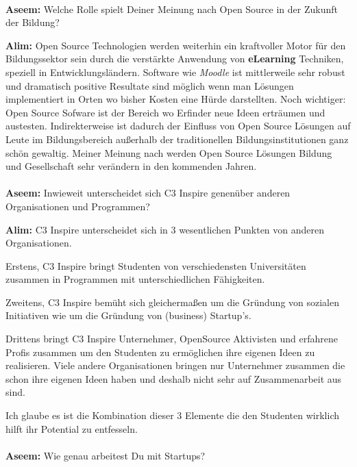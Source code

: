 \paragraph{}
\textbf{Aseem:} Welche Rolle spielt Deiner Meinung nach Open Source in der 
Zukunft der Bildung?

\textbf{Alim:} Open Source Technologien werden weiterhin ein kraftvoller Motor 
für den Bildungssektor sein durch die verstärkte Anwendung von 
\textbf{eLearning} Techniken, speziell in Entwicklungsländern. Software wie 
\textit{Moodle} ist mittlerweile sehr robust und dramatisch positive Resultate 
sind möglich wenn man Lösungen implementiert in Orten wo bisher 
Kosten eine Hürde darstellten. Noch wichtiger: Open Source Sofware ist 
der Bereich wo Erfinder neue Ideen erträumen und austesten. 
Indirekterweise ist dadurch der Einfluss von Open Source Lösungen auf 
Leute im Bildungsbereich außerhalb der traditionellen 
Bildungsinstitutionen ganz schön gewaltig. Meiner Meinung nach werden 
Open Source Lösungen Bildung und Gesellschaft sehr verändern in den 
kommenden Jahren.

\paragraph{}
\textbf{Aseem:} Inwieweit unterscheidet sich C3 Inspire genenüber anderen 
Organisationen und Programmen?

\textbf{Alim:} C3 Inspire unterscheidet sich in 3 wesentlichen Punkten von 
anderen Organisationen. 

Erstens, C3 Inspire bringt Studenten von 
verschiedensten Universitäten zusammen in Programmen mit 
unterschiedlichen Fähigkeiten. 

Zweitens, C3 Inspire bemüht sich gleichermaßen um die Gründung von 
sozialen Initiativen wie um die Gründung von (business) Startup's. 

Drittens bringt C3 Inspire Unternehmer, OpenSource Aktivisten und 
erfahrene Profis zusammen um den Studenten zu ermöglichen ihre eigenen 
Ideen zu realisieren. Viele andere Organisationen bringen nur 
Unternehmer zusammen die schon ihre eigenen Ideen haben und deshalb 
nicht sehr auf Zusammenarbeit aus sind. 

Ich glaube es ist die Kombination dieser 3 Elemente die den Studenten 
wirklich hilft ihr Potential zu entfesseln.

\paragraph{}
\textbf{Aseem:} Wie genau arbeitest Du mit Startups?

